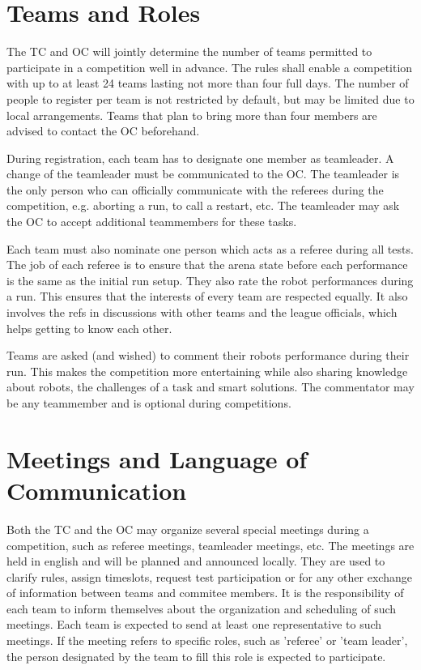 \label{sec:Competition}

\section{Teams and Roles}

The TC and OC will jointly determine the number of teams permitted to participate in a competition well in advance. The rules shall enable a competition with up to at least 24 teams lasting not more than four full days. The number of people to register per team is not restricted by default, but may be limited due to local arrangements. Teams that plan to bring more than four members are advised to contact the OC beforehand.

During registration, each team has to designate one member as teamleader. A change of the teamleader must be communicated to the OC. 
The teamleader is the only person who can officially communicate with the referees during the competition, e.g. aborting a run, to call a restart, etc. 
The teamleader may ask the OC to accept additional teammembers for these tasks.

Each team must also nominate one person which acts as a referee during all tests.
The job of each referee is to ensure that the arena state before each performance is the same as the initial run setup.
They also rate the robot performances during a run. 
This ensures that the interests of every team are respected equally.
It also involves the refs in discussions with other teams and the league officials,
which helps getting to know each other.

Teams are asked (and wished) to comment their robots performance during their run.
This makes the competition more entertaining while also sharing knowledge about robots, 
the challenges of a task and smart solutions.
The commentator may be any teammember and is optional during competitions.

\section{Meetings and Language of Communication}

Both the TC and the OC may organize several special meetings during a competition, 
such as referee meetings, teamleader meetings, etc.
The meetings are held in english and will be planned and announced locally.
They are used to clarify rules, assign timeslots, request test participation or for any other exchange of information between teams and commitee members.
It is the responsibility of each team to inform themselves about the organization and scheduling of such meetings.
Each team is expected to send at least one representative to such meetings. If the meeting refers to specific roles, such as 'referee' or 'team leader', the person designated by the team to fill this role is expected to participate.


